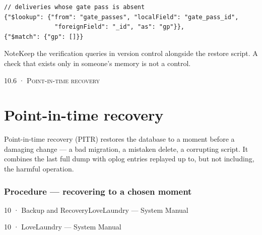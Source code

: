 \documentclass[11pt,a4paper,oneside]{book}
\begin{document}
\begin{verbatim}
// deliveries whose gate pass is absent
{"$lookup": {"from": "gate_passes", "localField": "gate_pass_id",
              "foreignField": "_id", "as": "gp"}},
{"$match": {"gp": []}}
\end{verbatim}
\begin{notebox}NoteKeep the verification queries in version control alongside the restore script. A check that exists only in someone's memory is not a control.\end{notebox}
\textsc{\small\color{crimson}10.6 · Point-in-time recovery}\par\medskip
\section*{Point-in-time recovery}
Point-in-time recovery (PITR) restores the database to a moment before a damaging change — a bad migration, a mistaken delete, a corrupting script. It combines the last full dump with oplog entries replayed up to, but not including, the harmful operation.

\subsubsection*{Procedure — recovering to a chosen moment}
10 · Backup and RecoveryLoveLaundry — System Manual

10 · LoveLaundry — System Manual
\end{document}
